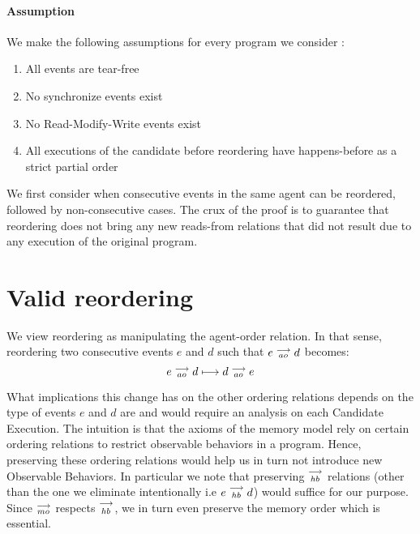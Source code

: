     \paragraph{Assumption}
    We make the following assumptions for every program we consider :
    \begin{enumerate}
        \item All events are tear-free
        \item No synchronize events exist
        \item No Read-Modify-Write events exist
        \item All executions of the candidate before reordering have happens-before as a strict partial order
    \end{enumerate}
    
    We first consider when consecutive events in the same agent can be reordered, followed by non-consecutive cases. The crux of the proof is to guarantee that reordering does not bring any new reads-from relations that did not result due to any execution of the original program. 
    


    

    

\section{Valid reordering}
    We view reordering as manipulating the agent-order relation. In that sense, reordering two consecutive events $e$ and $d$ such that $e \stackrel{\longrightarrow}{_{ao}} d$ becomes:
    \[
        e \stackrel{\longrightarrow}{_{ao}} d 
        \longmapsto
        d \stackrel{\longrightarrow}{_{ao}} e 
    \]

    What implications this change has on the other ordering relations depends on the type of events $e$ and $d$ are and would require an analysis on each Candidate Execution. 
    The intuition is that the axioms of the memory model rely on certain ordering relations to restrict observable behaviors in a program.
    Hence, preserving these ordering relations would help us in turn not introduce new Observable Behaviors.
    In particular we note that preserving $\stackrel{\longrightarrow}{_{hb}}$ relations (other than the one we eliminate intentionally i.e $e\stackrel{\longrightarrow}{_{hb}}d$) would suffice for our purpose. 
    Since $\stackrel{\longrightarrow}{_{mo}}$ respects $\stackrel{\longrightarrow}{_{hb}}$, we in turn even preserve the memory order which is essential.  

